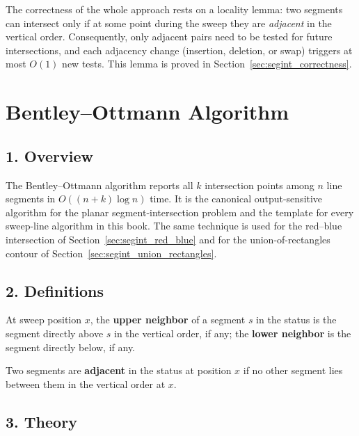 The correctness of the whole approach rests on a locality lemma:
two segments can intersect only if at some point during the sweep they are
\emph{adjacent} in the vertical order. Consequently, only adjacent pairs
need to be tested for future intersections, and each adjacency change
(insertion, deletion, or swap) triggers at most $O(1)$ new tests. This
lemma is proved in Section~\ref{sec:segint_correctness}.


\section{Bentley--Ottmann Algorithm}
\label{sec:segint_bentley_ottmann}

\subsection{1. Overview}

The Bentley--Ottmann algorithm \cite{bentley1979} reports all $k$
intersection points among $n$ line segments in $O((n+k)\log n)$ time. It is
the canonical output-sensitive algorithm for the planar segment-intersection
problem and the template for every sweep-line algorithm in this book. The
same technique is used for the red--blue intersection of
Section~\ref{sec:segint_red_blue} and for the union-of-rectangles contour of
Section~\ref{sec:segint_union_rectangles}.

\subsection{2. Definitions}

\begin{definition}\label{def:segint_neighbor}
  At sweep position $x$, the \textbf{upper neighbor} of a segment $s$ in the
  status is the segment directly above $s$ in the vertical order, if any;
  the \textbf{lower neighbor} is the segment directly below, if any.
\end{definition}

\begin{definition}\label{def:segint_adjacent}
  Two segments are \textbf{adjacent} in the status at position $x$ if no
  other segment lies between them in the vertical order at $x$.
\end{definition}

\subsection{3. Theory}

